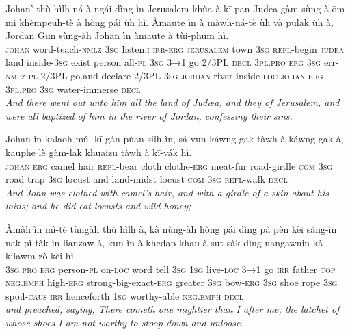 \documentclass[11pt,a4paper]{article}
\begin{document}
\begin{exe}
\gll Johan' thù-hìlh-ná à ngái dìng-ìn Jerusalem khùa à kī-pan Judea gàm sùng-à ōm mì khèmpeuh-tè à hòng pái ùh hì. Àmaute ìn à màwh-ná-tè ùh và pulak ùh à, Jordan Gun sùng-àh Johan ìn àmaute à tùi-phum hì. \\
     \textsc{johan} word-teach-\textsc{nmlz} \textsc{3sg} listen.\textsc{i} \textsc{irr}-\textsc{erg} \textsc{jerusalem} town \textsc{3sg} \textsc{refl}-begin \textsc{judea} land inside-\textsc{3sg} exist person all-\textsc{pl} \textsc{3sg} \textsc{3→1} go 2/3PL \textsc{decl} \textsc{3pl}.\textsc{pro} \textsc{erg} \textsc{3sg} err-\textsc{nmlz}-\textsc{pl} 2/3PL go.and declare 2/3PL \textsc{3sg} \textsc{jordan} river inside-\textsc{loc} \textsc{johan} \textsc{erg} \textsc{3pl}.\textsc{pro} \textsc{3sg} water-immerse \textsc{decl} \\
\glt \textcolor{kjvcolor}{\textit{And there went out unto him all the land of Judæa, and they of Jerusalem, and were all baptized of him in the river of Jordan, confessing their sins.}}

\gll Johan ìn kalaoh múl kī-gán pùan silh-ìn, sá-vun káwng-gak tàwh à káwng gak à, kauphe lè gàm-lak khuaizu tàwh à kī-vák hì. \\
     \textsc{johan} \textsc{erg} camel hair \textsc{refl}-bear cloth clothe-\textsc{erg} meat-fur road-girdle \textsc{com} \textsc{3sg} road trap \textsc{3sg} locust and land-midst locust \textsc{com} \textsc{3sg} \textsc{refl}-walk \textsc{decl} \\
\glt \textcolor{kjvcolor}{\textit{And John was clothed with camel's hair, and with a girdle of a skin about his loins; and he did eat locusts and wild honey;}}

\gll Àmàh ìn mì-tè tùngàh thù hìlh à, kà nùng-àh hòng pái dìng pà pèn kèi sàng-ìn nak-pì-tàk-ìn lianzaw à, kun-ìn à khedap khau à sut-sàk dìng nangawnin kà kilawm-zò kèi hì. \\
     \textsc{3sg}.\textsc{pro} \textsc{erg} person-\textsc{pl} on-\textsc{loc} word tell \textsc{3sg} \textsc{1sg} live-\textsc{loc} \textsc{3→1} go \textsc{irr} father \textsc{top} \textsc{neg}.\textsc{emph} high-\textsc{erg} strong-big-exact-\textsc{erg} greater \textsc{3sg} bow-\textsc{erg} \textsc{3sg} shoe rope \textsc{3sg} spoil-\textsc{caus} \textsc{irr} henceforth \textsc{1sg} worthy-able \textsc{neg}.\textsc{emph} \textsc{decl} \\
\glt \textcolor{kjvcolor}{\textit{and preached, saying, There cometh one mightier than I after me, the latchet of whose shoes I am not worthy to stoop down and unloose.}}


\end{exe}
\end{document}
